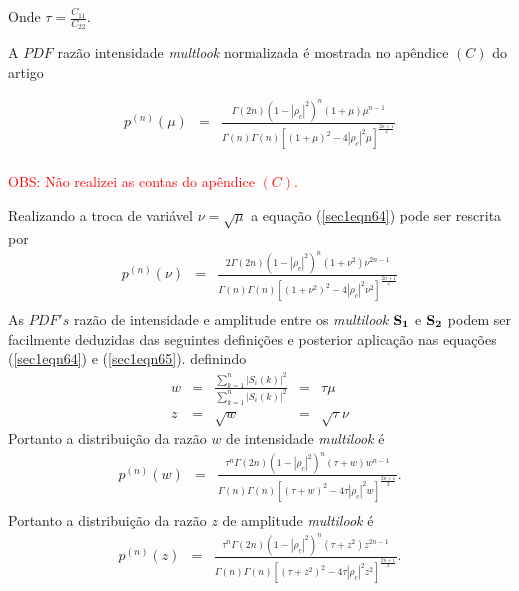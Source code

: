 \documentclass[10pt,a4paper]{article}
\begin{document}
Onde $\tau=\frac{C_{11}}{C_{22}}$.

A $PDF$ razão intensidade {\it multlook} normalizada é mostrada no apêndice $(C)$ do artigo \cite{lee94}  


\begin{equation}\label{sec1eqn64}
\begin{array}{ccc}
	p^{(n)}(\mu)&=&\frac{\Gamma(2n)(1-|\rho_c|^2)^{n}(1+\mu)\mu^{n-1}}{\Gamma(n)\Gamma(n)\left[(1+\mu)^2-4|\rho_c|^2\mu \right]^{\frac{2n+1}{2}}}\\
\end{array}
\end{equation}

\textcolor{red}{OBS: Não realizei as contas do apêndice $(C)$.}

Realizando a troca de variável $\nu=\sqrt{\mu}$ a equação (\ref{sec1eqn64}) pode ser rescrita por
\begin{equation}\label{sec1eqn65}
\begin{array}{ccc}
	p^{(n)}(\nu)&=&\frac{2\Gamma(2n)(1-|\rho_c|^2)^{n}(1+\nu^2)\nu^{2n-1}}{\Gamma(n)\Gamma(n)\left[(1+\nu^2)^2-4|\rho_c|^2\nu^2 \right]^{\frac{2n+1}{2}}}\\
\end{array}
\end{equation}
As $PDF's$ razão de intensidade e amplitude entre os {\it multilook} ${\bf S_1}$ e ${\bf S_2}$ podem ser facilmente deduzidas das seguintes definições e posterior aplicação nas equações (\ref{sec1eqn64}) e (\ref{sec1eqn65}). definindo 
\begin{equation}\label{sec1eqn66}
\begin{array}{ccccc}
	w&=&\frac{\displaystyle{\sum_{k=1}^{n}|S_i(k)|^2}}{\displaystyle{\sum_{k=1}^{n}|S_i(k)|^2}}&=&\tau\mu\\
	z&=&\sqrt{w}&=&\sqrt{\tau}\nu
\end{array}
\end{equation}
Portanto a distribuição da razão $w$ de intensidade {\it multilook} é
\begin{equation}\label{sec1eqn67}
\begin{array}{ccc}
	p^{(n)}(w)&=&\frac{\tau^{n}\Gamma(2n)(1-|\rho_c|^2)^{n}(\tau+w)w^{n-1}}{\Gamma(n)\Gamma(n)\left[(\tau+w)^2-4\tau|\rho_c|^2w \right]^{\frac{2n+1}{2}}}.\\
\end{array}
\end{equation}
Portanto a distribuição da razão $z$ de amplitude {\it multilook} é
\begin{equation}\label{sec1eqn68}
\begin{array}{ccc}
	p^{(n)}(z)&=&\frac{\tau^{n}\Gamma(2n)(1-|\rho_c|^2)^{n}(\tau+z^2)z^{2n-1}}{\Gamma(n)\Gamma(n)\left[(\tau+z^2)^2-4\tau|\rho_c|^2z^2 \right]^{\frac{2n+1}{2}}}.\\
\end{array}
\end{equation}
\end{document}
